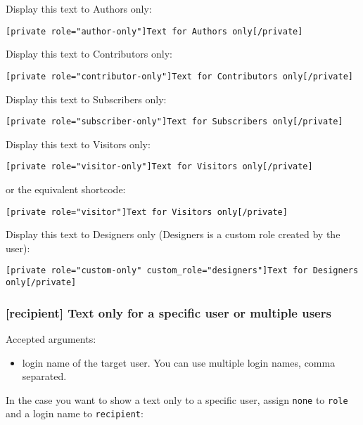 \documentclass[a4paper,10pt]{article}
\begin{document}
Display this text to Authors only:

\begin{lstlisting}
[private role="author-only"]Text for Authors only[/private]
\end{lstlisting}

Display this text to Contributors only:

\begin{lstlisting}
[private role="contributor-only"]Text for Contributors only[/private]
\end{lstlisting}

Display this text to Subscribers only:

\begin{lstlisting}
[private role="subscriber-only"]Text for Subscribers only[/private]
\end{lstlisting}

Display this text to Visitors only:

\begin{lstlisting}
[private role="visitor-only"]Text for Visitors only[/private]
\end{lstlisting}

or the equivalent shortcode:

\begin{lstlisting}
[private role="visitor"]Text for Visitors only[/private]
\end{lstlisting}

Display this text to Designers only (Designers is a custom role created by the user):

\begin{lstlisting}
[private role="custom-only" custom_role="designers"]Text for Designers only[/private]
\end{lstlisting}

\subsubsection{[recipient] Text only for a specific user or multiple users}

Accepted arguments:

\begin{itemize}
 \item login name of the target user. You can use multiple login names, comma separated.
\end{itemize}

In the case you want to show a text only to a specific user, assign \verb+none+ to \verb+role+ and a login name to \verb+recipient+:
\end{document}
